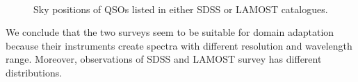 \begin{figure}
\\
\caption[Sky position of quasars of SDSS and LAMOST]{
	Sky positions of QSOs listed in either SDSS or LAMOST catalogues.
}
\label{qso_coverage}
\end{figure}

We conclude that the two surveys seem to be suitable for domain adaptation
because their instruments create spectra with different resolution and wavelength range.
Moreover, observations of SDSS and LAMOST survey has different distributions.
